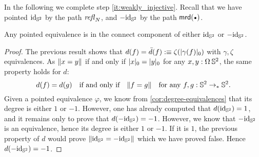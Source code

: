 \documentclass[english,a4]{article}
\newcommand{\ptdto}{\to_\ast}%
\newcommand{\settrunc}[1]{\trunc{#1}_0}
\begin{document}
In the following we complete step \ref{it:weakly_injective}. 
Recall that we have pointed $\mathord{\mathrm{id}}_{{\mathbb S^{2}}}$ by the path $\mathop{{\mathit{refl}}_{N}}$, 
and $-\mathord{\mathrm{id}}_{{\mathbb S^{2}}}$ by the path $\mrd(\base)$.
\begin{corollary}
  Any pointed equivalence is in the connect component of either $\mathord{\mathrm{id}}_{{\mathbb S^{2}}}$ or $-\mathord{\mathrm{id}}_{{\mathbb S^{2}}}$.
  \label{cor:equivalence-conn-component}
\end{corollary}
\begin{proof}
  The previous result shows that 
  $d(f) = \bar d(f) \defeq \zeta(\settrunc{\gamma(f)})$ 
  with $\gamma, \zeta$ equivalences. As
  $\lVert x = y\rVert$ if and only if $\settrunc x = \settrunc y$ for any
  $x,y:\loopspace\null \Sp$, the same property holds for $d$:
  \begin{displaymath}
    d(f) = d(g) \quad \text{if and only if}\quad
    \Trunc{f = g} \quad \text{for any}\ f,g:\Sp \ptdto\Sp.
  \end{displaymath}
  Given a pointed equivalence $\varphi$, we know from
  \cref{cor:degree-equivalences} that its degree is either $1$ or $-1$.
  However, one has already computed that $d(\mathord{\mathrm{id}}_{{\mathbb S^{2}}}) = 1$, and it remains only
  to prove that $d(-\mathord{\mathrm{id}}_{{\mathbb S^{2}}}) = -1$. However, we know that $-\mathord{\mathrm{id}}_{{\mathbb S^{2}}}$ is an
  equivalence, hence its degree is either $1$ or $-1$. If it is $1$, the
  previous property of $d$ would prove $\lVert\mathord{\mathrm{id}}_{{\mathbb S^{2}}} = -\mathord{\mathrm{id}}_{{\mathbb S^{2}}}\rVert$ which we
  have proved false. Hence $d(-\mathord{\mathrm{id}}_{{\mathbb S^{2}}}) = -1$.
  

\end{proof}
\end{document}
